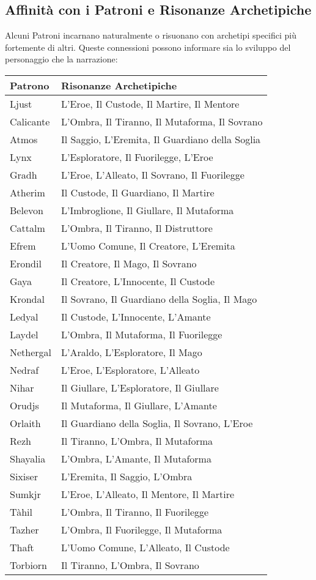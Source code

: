 \begin{multicols}{2}
\subsection*{Affinità con i Patroni e Risonanze Archetipiche}

Alcuni Patroni incarnano naturalmente o risuonano con archetipi specifici più fortemente di altri. Queste connessioni possono informare sia lo sviluppo del personaggio che la narrazione:

\medskip

\noindent\begin{tabularx}{\columnwidth}{lX}
	\toprule
\textbf{Patrono} & \textbf{Risonanze Archetipiche} \\
\toprule
Ljust & L'Eroe, Il Custode, Il Martire, Il Mentore \\
Calicante & L'Ombra, Il Tiranno, Il Mutaforma, Il Sovrano \\
Atmos & Il Saggio, L'Eremita, Il Guardiano della Soglia \\
Lynx & L'Esploratore, Il Fuorilegge, L'Eroe \\
Gradh & L'Eroe, L'Alleato, Il Sovrano, Il Fuorilegge \\
Atherim & Il Custode, Il Guardiano, Il Martire \\
Belevon & L'Imbroglione, Il Giullare, Il Mutaforma \\
Cattalm & L'Ombra, Il Tiranno, Il Distruttore \\
Efrem & L'Uomo Comune, Il Creatore, L'Eremita \\
Erondil & Il Creatore, Il Mago, Il Sovrano \\
Gaya & Il Creatore, L'Innocente, Il Custode \\
Krondal & Il Sovrano, Il Guardiano della Soglia, Il Mago \\
Ledyal & Il Custode, L'Innocente, L'Amante \\
Laydel & L'Ombra, Il Mutaforma, Il Fuorilegge \\
Nethergal & L'Araldo, L'Esploratore, Il Mago \\
Nedraf & L'Eroe, L'Esploratore, L'Alleato \\
Nihar & Il Giullare, L'Esploratore, Il Giullare \\
Orudjs & Il Mutaforma, Il Giullare, L'Amante \\
Orlaith & Il Guardiano della Soglia, Il Sovrano, L'Eroe \\
Rezh & Il Tiranno, L'Ombra, Il Mutaforma \\
Shayalia & L'Ombra, L'Amante, Il Mutaforma \\
Sixiser & L'Eremita, Il Saggio, L'Ombra \\
Sumkjr & L'Eroe, L'Alleato, Il Mentore, Il Martire \\
Tàhil & L'Ombra, Il Tiranno, Il Fuorilegge \\
Tazher & L'Ombra, Il Fuorilegge, Il Mutaforma \\
Thaft & L'Uomo Comune, L'Alleato, Il Custode \\
Torbiorn & Il Tiranno, L'Ombra, Il Sovrano \\


\end{tabularx}
\end{multicols}

